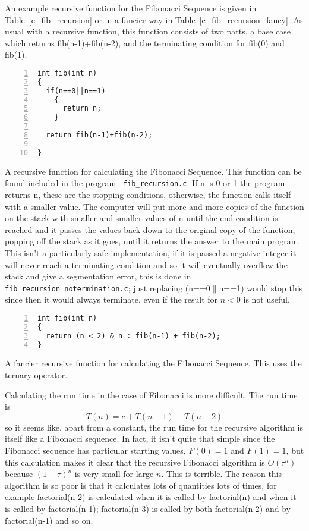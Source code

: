 \documentclass[11pt,a4paper]{scrartcl}
\begin{document}
An example recursive function for the Fibonacci Sequence is given in
Table~\ref{c_fib_recursion} or in a fancier way in
Table~\ref{c_fib_recursion_fancy}.  As usual with a recursive
function, this function consists of two parts, a base case which
returns fib(n-1)+fib(n-2), and the terminating condition for fib(0)
and fib(1).

\begin{table}
\begin{lstlisting}[numbers=left]
int fib(int n)
{
  if(n==0||n==1)
    {
      return n;
    }

  return fib(n-1)+fib(n-2);

}
\end{lstlisting}
\caption{A recursive function for calculating the Fibonacci
  Sequence. This function can be found included in the program {\tt
    fib\_recursion.c}. If n is 0 or 1 the program returns n, these are
  the stopping conditions, otherwise, the function calls itself with a
  smaller value. The computer will put more and more copies of the
  function on the stack with smaller and smaller values of n until the
  end condition is reached and it passes the values back down to the
  original copy of the function, popping off the stack as it goes,
  until it returns the answer to the main program. This isn't a
  particularly safe implementation, if it is passed a negative integer
  it will never reach a terminating condition and so it will
  eventually overflow the stack and give a segmentation error, this is
  done in {\tt fib\_recursion\_no\-termination.c}; just replacing
  (n==0$\|$n==1) would stop this since then it would always terminate,
  even if the result for $n<0$ is not useful.\label{c_fib_recursion}}
\end{table}


\begin{table}
\begin{lstlisting}[numbers=left]
int fib(int n)
{
  return (n < 2) & n : fib(n-1) + fib(n-2); 
}
\end{lstlisting}
\caption{A fancier recursive function for calculating the Fibonacci Sequence. This uses the ternary operator. \label{c_fib_recursion_fancy}}
\end{table}

Calculating the run time in the case of Fibonacci is more
difficult. The run time is
\begin{equation}
T(n)=c+T(n-1)+T(n-2)
\end{equation}
so it seems like, apart from a constant, the run time for the
recursive algorithm is itself like a Fibonacci sequence. In fact, it
isn't quite that simple since the Fibonacci sequence has particular
starting values, $F(0)=1$ and $F(1)=1$, but this calculation makes it
clear that the recursive Fibonacci algorithm is $O(\tau^n)$ because
$(1-\tau)^n$ is very small for large $n$. This is terrible. The reason
this algorithm is so poor is that it calculates lots of quantities
lots of times, for example factorial(n-2) is calculated when it is
called by factorial(n) and when it is called by factorial(n-1);
factorial(n-3) is called by both factorial(n-2) and by factorial(n-1)
and so on.
\end{document}
